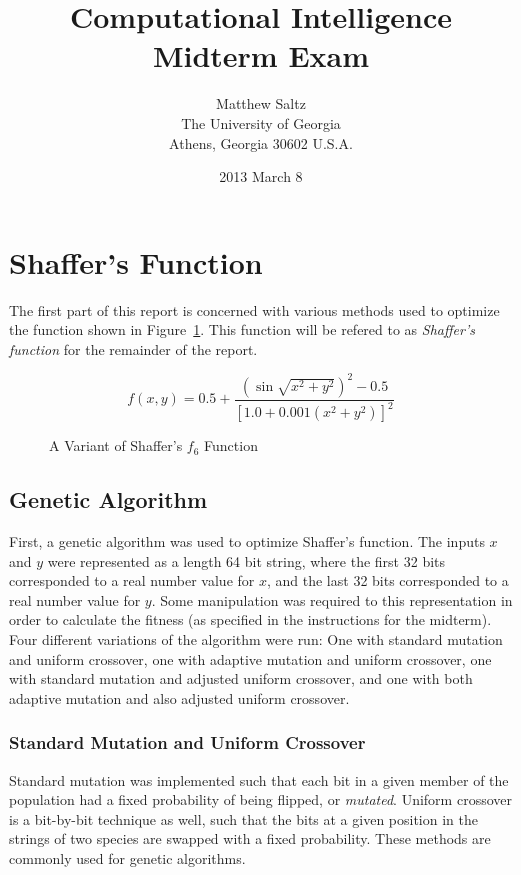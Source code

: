 \documentclass[12pt,fleqn]{article}
\title{\bf Computational Intelligence Midterm Exam}
\author{Matthew Saltz \\
        The University of Georgia \\
        Athens, Georgia 30602 U.S.A.}
\date{2013 March 8}
\begin{document}
\maketitle
\section{Shaffer's Function}
The first part of this report is concerned with various methods
used to optimize the function shown in Figure~\ref{fig:shaffer}.  This function
will be refered to as {\em Shaffer's function} for the remainder of the report.

\begin{figure}
\begin{center}
$$f(x,y) = 0.5 + \frac{(\sin{\sqrt{x^2+y^2}})^2 - 0.5}{[1.0+0.001(x^2+y^2)]^2}$$
\end{center}
\caption{A Variant of Shaffer's $f_6$ Function}
\label{fig:shaffer}
\end{figure}

\subsection{Genetic Algorithm}
First, a genetic algorithm was used to optimize Shaffer's function.  The inputs
$x$ and $y$ were represented as a length 64 bit string, where the first 32 bits
corresponded to a real number value for $x$, and the last 32 bits corresponded 
to a real number value for $y$.  Some manipulation was required to this 
representation in order to calculate the fitness (as specified in the instructions
for the midterm).  Four different variations of the algorithm were run:  One with 
standard mutation and uniform crossover, one with adaptive mutation and uniform 
crossover, one with standard mutation and adjusted uniform crossover, and one with
both adaptive mutation and also adjusted uniform crossover.

\subsubsection{Standard Mutation and Uniform Crossover}
Standard mutation was implemented such that each bit in a given member of the population
had a fixed probability of being flipped, or {\em mutated}.  Uniform crossover
is a bit-by-bit technique as well, such that the bits at a given position in the strings
of two species are swapped with a fixed probability.  These methods are commonly used for
genetic algorithms.
\end{document}
